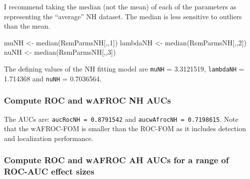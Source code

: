 \documentclass[
]{book}
\newenvironment{Shaded}{\begin{snugshade}}{\end{snugshade}}
\newcommand{\AttributeTok}[1]{\textcolor[rgb]{0.77,0.63,0.00}{#1}}
\newcommand{\DecValTok}[1]{\textcolor[rgb]{0.00,0.00,0.81}{#1}}
\newcommand{\FunctionTok}[1]{\textcolor[rgb]{0.00,0.00,0.00}{#1}}
\newcommand{\NormalTok}[1]{#1}
\newcommand{\OtherTok}[1]{\textcolor[rgb]{0.56,0.35,0.01}{#1}}
\newcommand{\SpecialCharTok}[1]{\textcolor[rgb]{0.00,0.00,0.00}{#1}}
\begin{document}
I recommend taking the median (not the mean) of each of the parameters as representing the ``average'' NH dataset. The median is less sensitive to outliers than the mean.

\begin{Shaded}
\begin{Highlighting}[]
\NormalTok{muNH }\OtherTok{\textless{}{-}} \FunctionTok{median}\NormalTok{(RsmParmsNH[,,}\DecValTok{1}\NormalTok{]) }
\NormalTok{lambdaNH }\OtherTok{\textless{}{-}} \FunctionTok{median}\NormalTok{(RsmParmsNH[,,}\DecValTok{2}\NormalTok{])}
\NormalTok{nuNH }\OtherTok{\textless{}{-}} \FunctionTok{median}\NormalTok{(RsmParmsNH[,,}\DecValTok{3}\NormalTok{])}
\end{Highlighting}
\end{Shaded}

The defining values of the NH fitting model are \texttt{muNH} = 3.3121519, \texttt{lambdaNH} = 1.714368 and \texttt{nuNH} = 0.7036564.

\hypertarget{compute-roc-and-wafroc-nh-aucs}{%
\subsubsection{Compute ROC and wAFROC NH AUCs}\label{compute-roc-and-wafroc-nh-aucs}}

\begin{Shaded}
\end{Shaded}

The AUCs are: \texttt{aucRocNH\ =\ 0.8791542} and \texttt{aucwAfrocNH\ =\ 0.7198615}. Note that the wAFROC-FOM is smaller than the ROC-FOM as it includes detection and localization performance.

\hypertarget{compute-roc-and-wafroc-ah-aucs-for-a-range-of-roc-auc-effect-sizes}{%
\subsubsection{Compute ROC and wAFROC AH AUCs for a range of ROC-AUC effect sizes}\label{compute-roc-and-wafroc-ah-aucs-for-a-range-of-roc-auc-effect-sizes}}
\end{document}
